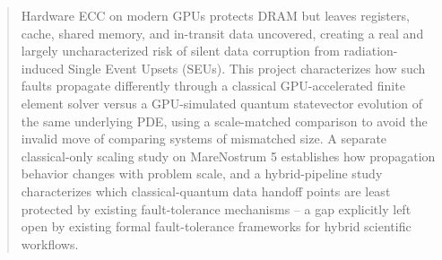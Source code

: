 \begin{abstract}
Hardware ECC on modern GPUs protects DRAM but leaves registers, cache, shared memory, and in-transit data uncovered, creating a real and largely uncharacterized risk of silent data corruption from radiation-induced Single Event Upsets (SEUs). This project characterizes how such faults propagate differently through a classical GPU-accelerated finite element solver versus a GPU-simulated quantum statevector evolution of the same underlying PDE, using a scale-matched comparison to avoid the invalid move of comparing systems of mismatched size. A separate classical-only scaling study on MareNostrum 5 establishes how propagation behavior changes with problem scale, and a hybrid-pipeline study characterizes which classical-quantum data handoff points are least protected by existing fault-tolerance mechanisms -- a gap explicitly left open by existing formal fault-tolerance frameworks for hybrid scientific workflows.
\end{abstract}

